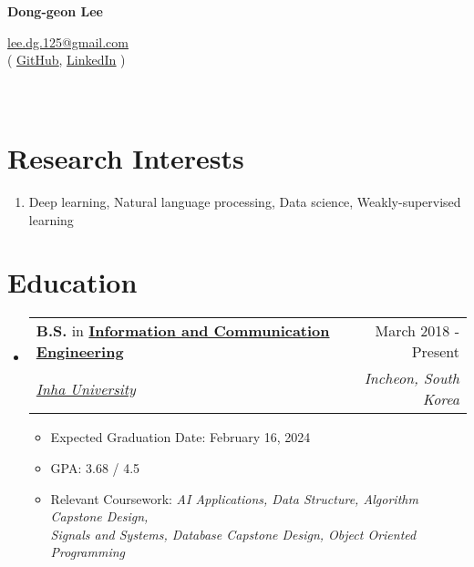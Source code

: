 \documentclass[letterpaper,11pt]{article}
\makeatletter
\newcommand{\resumeSubheading}[4]{
  \vspace{-1pt}\item
    \begin{tabular*}{0.97\textwidth}{l@{\extracolsep{\fill}}r}
      #1 & #2 \\
      \textit{\small#3} & \textit{\small #4} \\
    \end{tabular*}\vspace{-5pt}
}
\makeatother
\begin{document}
    \pagestyle{fancy}
    \thispagestyle{fancy}
    
    \begin{center}
        {\LARGE{\bf{Dong-geon Lee}}\\}
    \end{center}
    
    \vspace{-14pt}
    
    \begin{center} 
        {\href{mailto:lee.dg.125@gmail.com}{lee.dg.125@gmail.com} \\}
        {
            ( \underline{\href{https://github.com/oneonlee}{GitHub}}, 
            \underline{\href{https://www.linkedin.com/in/dong-geon-lee/}{LinkedIn}} )
        }
    \end{center}

    \section{\\Research Interests}
    \begin{enumerate}[noitemsep, leftmargin=*,label={}]
    \item{ Deep learning, Natural language processing, Data science, Weakly-supervised learning}
    \end{enumerate}
    
    \section{Education}
    \begin{itemize}[leftmargin=*,label=]
        \resumeSubheading
        {\textbf{B.S.} in \textbf{\href{http://bit.ly/3Uu4LTi}{Information and Communication Engineering}}}{March 2018 - Present}{\href{https://eng.inha.ac.kr/eng/index.do}{Inha University}}{Incheon, South Korea}
            \begin{itemize}[label=\bullet]
                \item{Expected Graduation Date: February 16, 2024}
                \item{GPA: 3.68 / 4.5}
                \item{Relevant Coursework: \textit{AI Applications, Data Structure, Algorithm Capstone Design, \\ Signals and Systems, Database Capstone Design, Object Oriented Programming}}
            \end{itemize}
    \end{itemize}
    
\end{document}
